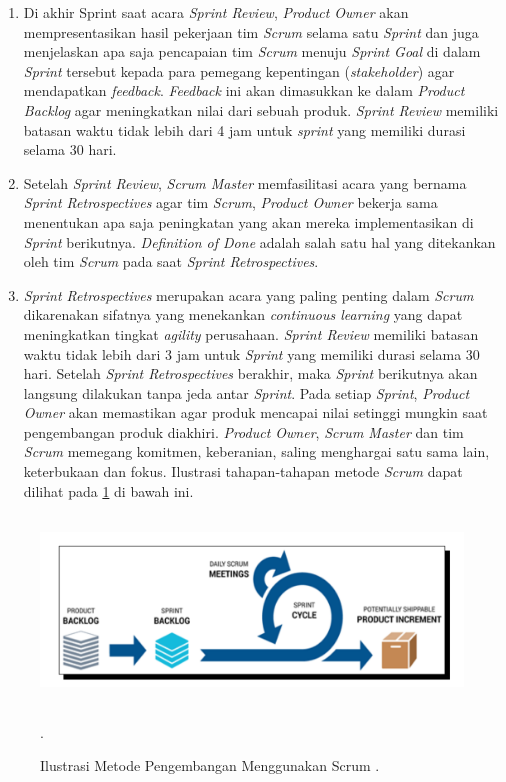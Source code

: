 \begin{enumerate}
\item Di akhir Sprint saat acara \textit{Sprint Review}, \textit{Product Owner} akan mempresentasikan hasil pekerjaan tim \textit{Scrum} selama satu \textit{Sprint} dan juga menjelaskan apa saja pencapaian tim \textit{Scrum} menuju \textit{Sprint Goal} di dalam \textit{Sprint} tersebut kepada para pemegang kepentingan (\textit{stakeholder}) agar mendapatkan \textit{feedback}. \textit{Feedback} ini akan dimasukkan ke dalam \textit{Product Backlog} agar meningkatkan nilai dari sebuah produk. \textit{Sprint Review} memiliki batasan waktu tidak lebih dari 4 jam untuk \textit{sprint} yang memiliki durasi selama 30 hari.

\item Setelah \textit{Sprint Review}, \textit{Scrum Master} memfasilitasi acara yang bernama \textit{Sprint Retrospectives} agar tim \textit{Scrum}, \textit{Product Owner} bekerja sama menentukan apa saja peningkatan yang akan mereka implementasikan di \textit{Sprint} berikutnya. \textit{Definition of Done} adalah salah satu hal yang ditekankan oleh tim \textit{Scrum} pada saat \textit{Sprint Retrospectives}.

\item \textit{Sprint Retrospectives} merupakan acara yang paling penting dalam \textit{Scrum} dikarenakan sifatnya yang menekankan \textit{continuous learning} yang dapat meningkatkan tingkat \textit{agility} perusahaan. \textit{Sprint Review} memiliki batasan waktu tidak lebih dari 3 jam untuk \textit{Sprint} yang memiliki durasi selama 30 hari. Setelah \textit{Sprint Retrospectives} berakhir, maka \textit{Sprint} berikutnya akan langsung dilakukan tanpa jeda antar \textit{Sprint}. Pada setiap \textit{Sprint}, \textit{Product Owner} akan memastikan agar produk mencapai nilai setinggi mungkin saat pengembangan produk diakhiri. \textit{Product Owner}, \textit{Scrum Master} dan tim \textit{Scrum} memegang komitmen, keberanian, saling menghargai satu sama lain, keterbukaan dan fokus. Ilustrasi tahapan-tahapan metode \textit{Scrum} dapat dilihat pada \ref{img:scrum} di bawah ini.
\end{enumerate}

\begin{figure}[H]
\centering
\shadowbox
{\includegraphics [width = 14cm, height= 5cm]{gambar/bab2/Scrum}}
\caption{Ilustrasi Metode Pengembangan Menggunakan Scrum \citep{schwaber2011scrum}.}.
\label{img:scrum}
\end{figure}


